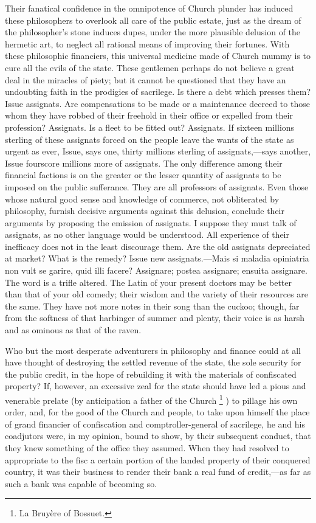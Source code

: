Their fanatical confidence in the omnipotence of Church plunder has induced these philosophers to overlook all care of the public estate, just as the dream of the philosopher's stone induces dupes, under the more plausible delusion of the hermetic art, to neglect all rational means of improving their fortunes. With these philosophic financiers, this universal medicine made of Church mummy is to cure all the evils of the state. These gentlemen perhaps do not believe a great deal in the miracles of piety; but it cannot be questioned that they have an undoubting faith in the prodigies of sacrilege. Is there a debt which presses them? Issue assignats. Are compensations to be made or a maintenance decreed to those whom they have robbed of their freehold in their office or expelled from their profession? Assignats. Is a fleet to be fitted out? Assignats. If sixteen millions sterling of these assignats forced on the people leave the wants of the state as urgent as ever, Issue, says one, thirty millions sterling of assignats,—says another, Issue fourscore millions more of assignats. The only difference among their financial factions is on the greater or the lesser quantity of assignats to be imposed on the public sufferance. They are all professors of assignats. Even those whose natural good sense and knowledge of commerce, not obliterated by philosophy, furnish decisive arguments against this delusion, conclude their arguments by proposing the emission of assignats. I suppose they must talk of assignats, as no other language would be understood. All experience of their inefficacy does not in the least discourage them. Are the old assignats depreciated at market? What is the remedy? Issue new assignats.—Mais si maladia opiniatria non vult se garire, quid illi facere? Assignare; postea assignare; ensuita assignare. The word is a trifle altered. The Latin of your present doctors may be better than that of your old comedy; their wisdom and the variety of their resources are the same. They have not more notes in their song than the cuckoo; though, far from the softness of that harbinger of summer and plenty, their voice is as harsh and as ominous as that of the raven.

Who but the most desperate adventurers in philosophy and finance could at all have thought of destroying the settled revenue of the state, the sole security for the public credit, in the hope of rebuilding it with the materials of confiscated property? If, however, an excessive zeal for the state should have led a pious and venerable prelate (by anticipation a father of the Church
\footnote{ La Bruyère of Bossuet.}
) to pillage his own order, and, for the good of the Church and people, to take upon himself the place of grand financier of confiscation and comptroller-general of sacrilege, he and his coadjutors were, in my opinion, bound to show, by their subsequent conduct, that they knew something of the office they assumed. When they had resolved to appropriate to the fisc a certain portion of the landed property of their conquered country, it was their business to render their bank a real fund of credit,—as far as such a bank was capable of becoming so.

